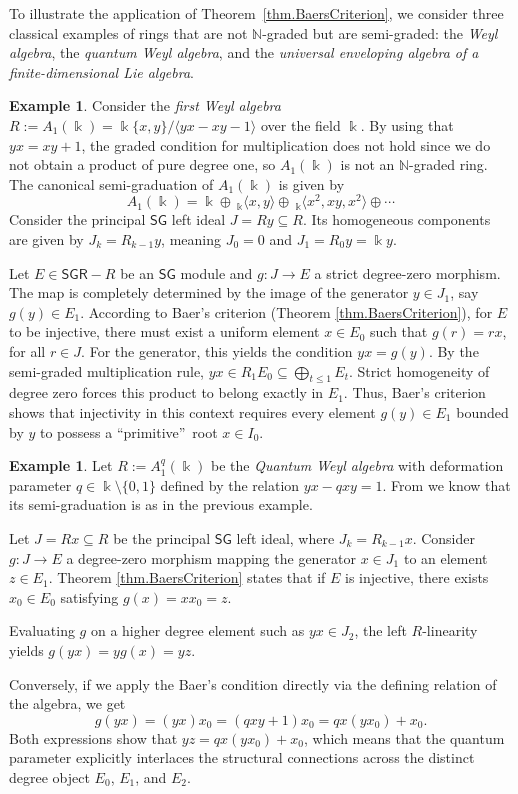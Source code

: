 \documentclass[reqno]{amsart}
\theoremstyle{definition}
\newtheorem{example}[theorem]{Example}
\theoremstyle{remark}
\numberwithin{equation}{section}
\begin{document}
To illustrate the application of Theorem~\ref{thm.BaersCriterion}, we consider three classical examples of rings that are not $\mathbb{N}$-graded but are semi-graded: the {\em Weyl algebra}, the {\em quantum Weyl algebra}, and the {\em universal enveloping algebra of a finite-dimensional Lie algebra}.

\begin{example}
Consider the {\em first Weyl algebra} $R := A_1(\Bbbk) = \Bbbk\{ x,y\}/ \langle yx-xy-1\rangle$ over the field $\Bbbk$. By using that $yx = xy + 1$, the graded condition for multiplication does not hold since we do not obtain a product of pure degree one, so $A_1(\Bbbk)$ is not an $\mathbb{N}$-graded ring. The canonical semi-graduation of $A_1(\Bbbk)$ \cite[Example 4.5]{Lezama2021} is given by
\[
A_1(\Bbbk) = \Bbbk \oplus\ _{\Bbbk}\langle x, y\rangle \oplus\ _{\Bbbk} \langle x^2, xy, x^2\rangle \oplus \dotsb 
\]
Consider the principal $\mathsf{SG}$ left ideal $J = R y \subseteq R$. Its homogeneous components are given by $J_k = R_{k-1} y$, meaning $J_0 = 0$ and $J_1 = R_0 y = \Bbbk  y$. 

Let $E \in \mathsf{SGR}-R$ be an $\mathsf{SG}$ module and $g: J \to E$ a strict degree-zero morphism. The map is completely determined by the image of the generator $y \in J_1$, say $g(y)\in E_1$. According to Baer's criterion (Theorem \ref{thm.BaersCriterion}), for $E$ to be injective, there must exist a uniform element $x \in E_0$ such that $g(r) = r x$, for all $r \in J$. For the generator, this yields the condition $y x = g(y)$. By the semi-graded multiplication rule, $y x \in R_1 E_0 \subseteq \bigoplus_{t \leq 1} E_t$. Strict homogeneity of degree zero forces this product to belong exactly in $E_1$. Thus, Baer's criterion shows that injectivity in this context requires every element $g(y) \in E_1$ bounded by $y$ to possess a \textquotedblleft primitive\textquotedblright\ root $x \in I_0$.
\end{example}

\begin{example}
Let $R := A_1^q(\Bbbk)$ be the {\em Quantum Weyl algebra} with deformation parameter $q \in \Bbbk \setminus \{0, 1\}$ defined by the relation $y  x - qxy = 1$. From \cite[Example 4.6]{Lezama2021} we know that its semi-graduation is as in the previous example. 

Let $J = R x \subseteq R$ be the principal $\mathsf{SG}$ left ideal, where $J_k = R_{k-1} x$. Consider $g: J \to E$ a degree-zero morphism mapping the generator $x \in J_1$ to an element $z \in E_1$. Theorem \ref{thm.BaersCriterion} states that if $E$ is injective, there exists $x_0 \in E_0$ satisfying $g(x) = x x_0 = z$. 

Evaluating $g$ on a higher degree element such as $y x \in J_2$, the left $R$-linearity yields $g(y x) = y g(x) = y z$. 

Conversely, if we apply the Baer's condition directly via the defining relation of the algebra, we get 
\[
g(y x) = (y x) x_0 = (q x y + 1) x_0 = q x (y x_0) + x_0.
\]
Both expressions show that $y z = q x (y x_0) + x_0$, which means that the quantum parameter explicitly interlaces the structural connections across the distinct degree object $E_0$, $E_1$, and $E_2$.
\end{example}
\end{document}
